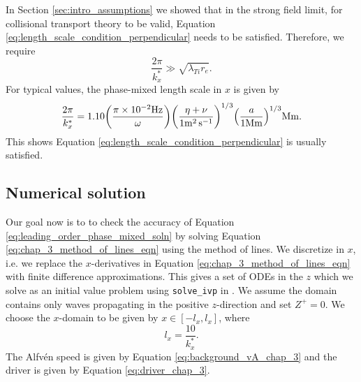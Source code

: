In Section \ref{sec:intro_assumptions} we showed that in the strong field limit, for collisional transport theory to be valid, Equation \eqref{eq:length_scale_condition_perpendicular} needs to be satisfied. Therefore, we require
\begin{equation}
    \frac{2\pi}{k_x^*} \gg \sqrt{\lambda_{Ti} r_e}.
\end{equation}
For typical values, the phase-mixed length scale in $x$ is given by
\begin{equation}
    \frac{2\pi}{k_x^*}=1.10\qty(\frac{\pi\times10^{-2}\si{.Hz}}{\omega})\qty(\frac{\eta+\nu}{1\si{.m^2.s^{-1}}})^{1/3}\qty(\frac{a}{1\si{.Mm}})^{1/3}\si{.Mm}.
\end{equation}
This shows Equation \eqref{eq:length_scale_condition_perpendicular} is usually satisfied.

\subsection{Numerical solution}

Our goal now is to to check the accuracy of Equation \eqref{eq:leading_order_phase_mixed_soln} by solving Equation \eqref{eq:chap_3_method_of_lines_eqn} using the method of lines. We discretize in $x$, i.e. we replace the $x$-derivatives in Equation \eqref{eq:chap_3_method_of_lines_eqn} with finite difference approximations. This gives a set of ODEs in the $z$ which we solve as an initial value problem using \texttt{solve\_ivp} in \citet{SciPy2020}. We assume the domain contains only waves propagating in the positive $z$-direction and set $Z^{+}=0$. We choose the $x$-domain to be given by $x\in[-l_x,l_x]$, 
where
\[l_x = \frac{10}{k_x^*}.\]
The Alfv\'en speed is given by Equation \eqref{eq:background_vA_chap_3} and the driver is given by  Equation \eqref{eq:driver_chap_3}.

